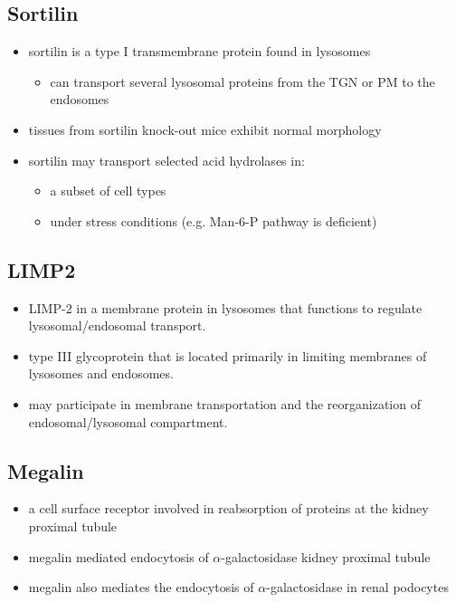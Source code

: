 \documentclass{scrartcl}
\begin{document}
\subsection{Sortilin}
\label{sec:org1166cb5}
\begin{itemize}
\item sortilin is a type I transmembrane protein found in lysosomes
\begin{itemize}
\item can transport several lysosomal proteins from the TGN or PM to the endosomes
\end{itemize}
\item tissues from sortilin knock-out mice exhibit normal morphology
\item sortilin may transport selected acid hydrolases in:
\begin{itemize}
\item a subset of cell types
\item under stress conditions (e.g. Man-6-P pathway is deficient)
\end{itemize}
\end{itemize}

\subsection{LIMP2}
\label{sec:orgb6e2d97}
\begin{itemize}
\item LIMP-2 in a membrane protein in lysosomes that functions to regulate lysosomal/endosomal transport.
\item type III glycoprotein that is located primarily in limiting membranes of lysosomes and endosomes.
\item may participate in membrane transportation and the reorganization of endosomal/lysosomal compartment.
\end{itemize}

\subsection{Megalin}
\label{sec:org3910dff}
\begin{itemize}
\item a cell surface receptor involved in reabsorption of proteins at the kidney proximal tubule
\item megalin mediated endocytosis of \(\alpha\)-galactosidase kidney proximal tubule
\item megalin also mediates the endocytosis of \(\alpha\)-galactosidase in renal podocytes
\end{itemize}
\end{document}
